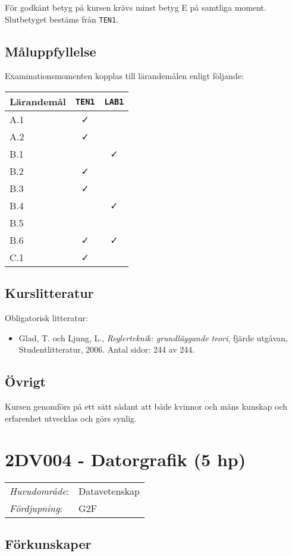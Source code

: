 För godkänt betyg på kursen krävs minst betyg E på samtliga moment.
Slutbetyget bestäms från \texttt{TEN1}.

\subsection*{Måluppfyllelse}

Examinationsmomenten kopplas till lärandemålen enligt följande:

\begin{longtable}[]{@{}lcc@{}}
\toprule
\textsf{Lärandemål} & \texttt{TEN1} & \texttt{LAB1}\tabularnewline
\midrule
\endhead
A.1 & \faCheck &\tabularnewline
A.2 & \faCheck &\tabularnewline
B.1 & & \faCheck\tabularnewline
B.2 & \faCheck &\tabularnewline
B.3 & \faCheck &\tabularnewline
B.4 & & \faCheck\tabularnewline
B.5 & &\tabularnewline
B.6 & \faCheck & \faCheck\tabularnewline
C.1 & \faCheck &\tabularnewline
\bottomrule
\end{longtable}

\subsection*{Kurslitteratur}

Obligatorisk litteratur:

\begin{itemize}
\tightlist
\item
  Glad, T. och Ljung, L., \emph{Reglerteknik: grundläggande teori},
  fjärde utgåvan, Studentlitteratur, 2006. Antal sidor: 244 av 244.
\end{itemize}

\subsection*{Övrigt}

Kursen genomförs på ett sätt sådant att både kvinnor och mäns kunskap och erfarenhet utvecklas och görs synlig.
\pagebreak
\section*{2DV004 - Datorgrafik (5 hp)}

\begin{tabular}{ll}\emph{Huvudområde}: & Datavetenskap\tabularnewline\emph{Fördjupning}: & G2F\tabularnewline\end{tabular}

\subsection*{Förkunskaper}

